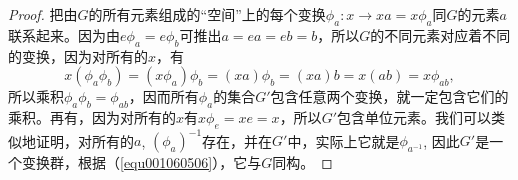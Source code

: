 \begin{proof}
把由$G$的所有元素组成的“空间”上的每个变换$\phi_a: x \to xa = x\phi_a$同$G$的元素$a$联系起来。因为由$e\phi_a = e\phi_b$可推出$a=ea=eb=b$，所以$G$的不同元素对应着不同的变换，因为对所有的$x$，有
\begin{equation}\label{equ001060506}
x(\phi_a\phi_b) = (x\phi_a)\phi_b = (xa)\phi_b = (xa)b = x(ab) = x\phi_{ab},
\end{equation}
所以乘积$\phi_a\phi_b = \phi_{ab}$，因而所有$\phi_a$的集合$G'$包含任意两个变换，就一定包含它们的乘积。再有，因为对所有的$x$有$x\phi_e = xe = x$，所以$G'$包含单位元素。我们可以类似地证明，对所有的$a$, $(\phi_a)^{-1}$存在，并在$G'$中，实际上它就是$\phi_{a^{-1}}$, 因此$G'$是一个变换群，根据（\ref{equ001060506}），它与$G$同构。
\end{proof}

